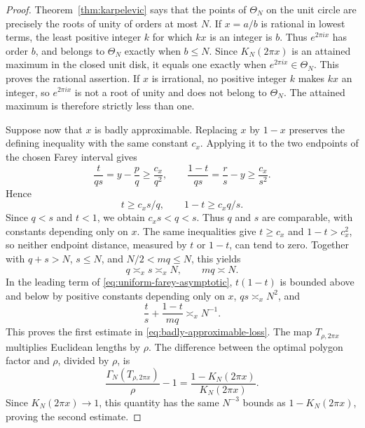 \documentclass[11pt,a4paper]{article}
\theoremstyle{definition}
\theoremstyle{remark}
\numberwithin{equation}{section}
\begin{document}
\begin{proof}
Theorem~\ref{thm:karpelevic} says that the points of $\Theta_N$ on the unit circle are precisely the roots of unity of orders at most $N$. If $x=a/b$ is rational in lowest terms, the least positive integer $k$ for which $kx$ is an integer is $b$. Thus $e^{2\pi ix}$ has order $b$, and belongs to $\Theta_N$ exactly when $b\le N$. Since $K_N(2\pi x)$ is an attained maximum in the closed unit disk, it equals one exactly when $e^{2\pi ix}\in\Theta_N$. This proves the rational assertion. If $x$ is irrational, no positive integer $k$ makes $kx$ an integer, so $e^{2\pi ix}$ is not a root of unity and does not belong to $\Theta_N$. The attained maximum is therefore strictly less than one.

Suppose now that $x$ is badly approximable. Replacing $x$ by $1-x$ preserves the defining inequality with the same constant $c_x$. Applying it to the two endpoints of the chosen Farey interval gives
\[
 \frac{t}{qs}=y-\frac pq\ge\frac{c_x}{q^2},\qquad
 \frac{1-t}{qs}=\frac rs-y\ge\frac{c_x}{s^2}.
\]
Hence
\[
 t\ge c_xs/q,\qquad 1-t\ge c_xq/s.
\]
Since $q<s$ and $t<1$, we obtain $c_xs<q<s$. Thus $q$ and $s$ are comparable, with constants depending only on $x$. The same inequalities give $t\ge c_x$ and $1-t>c_x^2$, so neither endpoint distance, measured by $t$ or $1-t$, can tend to zero.
Together with $q+s>N$, $s\le N$, and $N/2<mq\le N$, this yields
\[
 q\asymp_x s\asymp_x N,\qquad mq\asymp N.
\]
In the leading term of \eqref{eq:uniform-farey-asymptotic}, $t(1-t)$ is bounded above and below by positive constants depending only on $x$, $qs\asymp_x N^2$, and
\[
 \frac{t}{s}+\frac{1-t}{mq}\asymp_x N^{-1}.
\]
This proves the first estimate in \eqref{eq:badly-approximable-loss}. The map $T_{\rho,2\pi x}$ multiplies Euclidean lengths by $\rho$. The difference between the optimal polygon factor and $\rho$, divided by $\rho$, is
\[
 \frac{\Gamma_N(T_{\rho,2\pi x})}{\rho}-1
 =\frac{1-K_N(2\pi x)}{K_N(2\pi x)}.
\]
Since $K_N(2\pi x)\to1$, this quantity has the same $N^{-3}$ bounds as $1-K_N(2\pi x)$, proving the second estimate.


\end{proof}
\end{document}
